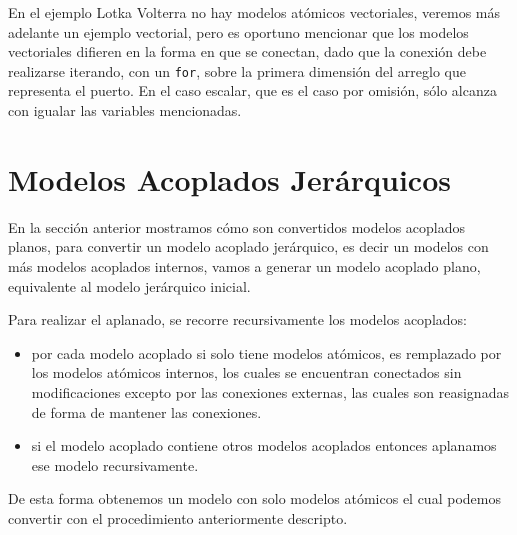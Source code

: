         En el ejemplo Lotka Volterra no hay modelos atómicos vectoriales, veremos más adelante un ejemplo vectorial, pero es oportuno mencionar que los modelos
        vectoriales difieren en la forma en que se conectan, dado que la conexión debe realizarse iterando, con un \texttt{for}, sobre la primera dimensión del 
        arreglo que representa el puerto. En el caso escalar, que es el caso por omisión, sólo alcanza con igualar las variables mencionadas.


\section{Modelos Acoplados Jerárquicos} \label{aplanado}
        En la sección anterior mostramos cómo son convertidos modelos acoplados planos, para convertir un modelo acoplado jerárquico, es decir un modelos con más 
        modelos acoplados internos, vamos a generar un modelo acoplado plano, equivalente al modelo jerárquico inicial.

        Para realizar el aplanado, se recorre recursivamente los modelos acoplados:

        \begin{itemize}
                \item por cada modelo acoplado si solo tiene modelos atómicos, es remplazado por los modelos atómicos internos, los cuales se encuentran conectados 
                        sin modificaciones excepto por las conexiones externas, las cuales son reasignadas de forma de mantener las conexiones.
                \item si el modelo acoplado contiene otros modelos acoplados entonces aplanamos ese modelo recursivamente.
        \end{itemize} 

        De esta forma obtenemos un modelo con solo modelos atómicos el cual podemos convertir con el procedimiento anteriormente descripto.

